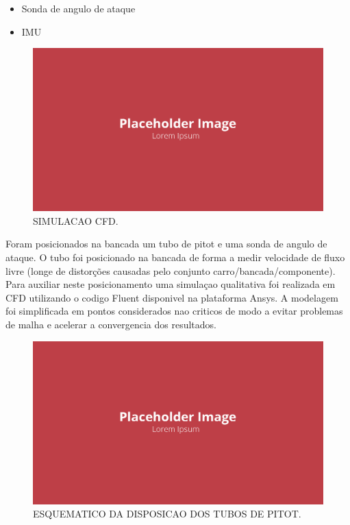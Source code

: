 \begin{itemize}
    \item Sonda de angulo de ataque
    \item IMU
\end{itemize}

\begin{figure}[!ht]
    \centering
    \includegraphics[width=.8\linewidth]{figuras/placeholder.png}
    \caption{SIMULACAO CFD\cite{autor}.}
    \label{fig:placeholder}
\end{figure}

Foram posicionados na bancada um tubo de pitot e uma sonda de angulo de ataque. O tubo foi posicionado na bancada de forma a medir velocidade de fluxo livre (longe de distorções causadas pelo conjunto carro/bancada/componente). Para auxiliar neste posicionamento uma simulaçao qualitativa foi realizada em CFD utilizando o codigo Fluent disponivel na plataforma Ansys. A modelagem foi simplificada em pontos considerados nao criticos de modo a evitar problemas de malha e acelerar a convergencia dos resultados.

\begin{figure}[!ht]
    \centering
    \includegraphics[width=.8\linewidth]{figuras/placeholder.png}
    \caption{ESQUEMATICO DA DISPOSICAO DOS TUBOS DE PITOT\cite{autor}.}
    \label{fig:placeholder}
\end{figure}

